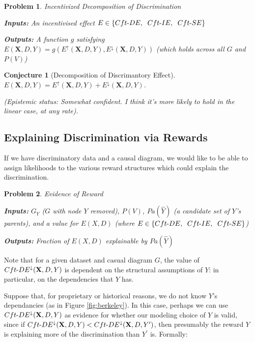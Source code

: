 \documentclass[letterpaper,10pt]{article}
\newtheorem{conjecture}{Conjecture}
\newtheorem{problem}{Problem}
\begin{document}
\begin{problem}{Incentivized Decomposition of Discrimination}

\textbf{Inputs:} An incentivised effect $E\in\{Cft{\text -}DE,\hspace{2mm} Cft{\text -}IE,\hspace{2mm} Cft{\text -}SE\}$

\textbf{Outputs:} A function $g$ satisfying $E(\mathbf{X},D,Y)=g(E^\uparrow(\mathbf{X},D,Y),E^\downarrow(\mathbf{X},D,Y))$ (which holds across all $G$ and $P(V)$)
\end{problem}

\begin{conjecture}[Decomposition of Discrimantory Effect]\label{decomp-conj}
$E(\mathbf{X},D,Y) = E^\uparrow(\mathbf{X},D,Y) + E^\downarrow(\mathbf{X},D,Y)$.

(Epistemic status: Somewhat confident. I think it's more likely to hold in the linear case, at any rate).
\end{conjecture}




\subsection{Explaining Discrimination via Rewards}
If we have discriminatory data and a causal diagram, we would like to be able to assign likelihoods to the various reward structures which could explain the discrimination.


\begin{problem}{Evidence of Reward}\label{reward-id}

\textbf{Inputs:} $G_Y$ ($G$ with node $Y$ removed), $P(V)$, $Pa(\hat{Y})$ (a candidate set of $Y$'s parents), and a value for $E(X,D)$ (where $E\in\{Cft{\text -}DE,\hspace{2mm} Cft{\text -}IE,\hspace{2mm} Cft{\text -}SE\}$)

\textbf{Outputs:} Fraction of $E(X,D)$ explainable by $Pa(\hat{Y})$
\end{problem}

Note that for a given dataset and casual diagram $G$, the value of $Cft{\text -}DE^\downarrow(\mathbf{X},D,Y)$ is dependent on the structural assumptions of $Y$: in particular, on the dependencies that $Y$ has. 

Suppose that, for proprietary or historical reasons, we do not know $Y$'s dependancies (as in Figure \ref{fig:berkeley}). In this case, perhaps we can use $Cft{\text -}DE^\downarrow(\mathbf{X},D,Y)$ as evidence for whether our modeling choice of $Y$ is valid, since if $Cft{\text -}DE^\downarrow(\mathbf{X},D,Y)<Cft{\text -}DE^\downarrow(\mathbf{X},D,Y^\prime)$, then presumably the reward $Y$ is explaining more of the discrimination than $Y^\prime$ is. Formally:
\end{document}
